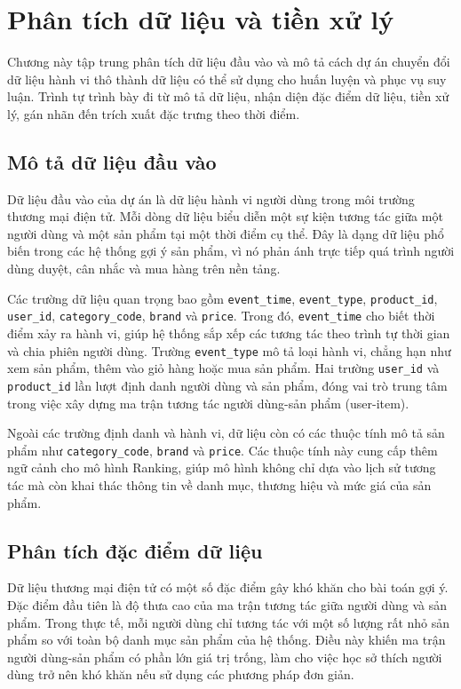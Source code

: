 ﻿\chapter{Phân tích dữ liệu và tiền xử lý}

Chương này tập trung phân tích dữ liệu đầu vào và mô tả cách dự án chuyển đổi dữ liệu hành vi thô thành dữ liệu có thể sử dụng cho huấn luyện và phục vụ suy luận. Trình tự trình bày đi từ mô tả dữ liệu, nhận diện đặc điểm dữ liệu, tiền xử lý, gán nhãn đến trích xuất đặc trưng theo thời điểm.

\section{Mô tả dữ liệu đầu vào}
Dữ liệu đầu vào của dự án là dữ liệu hành vi người dùng trong môi trường thương mại điện tử. Mỗi dòng dữ liệu biểu diễn một sự kiện tương tác giữa một người dùng và một sản phẩm tại một thời điểm cụ thể. Đây là dạng dữ liệu phổ biến trong các hệ thống gợi ý sản phẩm, vì nó phản ánh trực tiếp quá trình người dùng duyệt, cân nhắc và mua hàng trên nền tảng.
\medskip

Các trường dữ liệu quan trọng bao gồm \texttt{event\_time}, \texttt{event\_type}, \texttt{product\_id}, \texttt{user\_id}, \texttt{category\_code}, \texttt{brand} và \texttt{price}. Trong đó, \texttt{event\_time} cho biết thời điểm xảy ra hành vi, giúp hệ thống sắp xếp các tương tác theo trình tự thời gian và chia phiên người dùng. Trường \texttt{event\_type} mô tả loại hành vi, chẳng hạn như xem sản phẩm, thêm vào giỏ hàng hoặc mua sản phẩm. Hai trường \texttt{user\_id} và \texttt{product\_id} lần lượt định danh người dùng và sản phẩm, đóng vai trò trung tâm trong việc xây dựng ma trận tương tác người dùng-sản phẩm (user-item).
\medskip

Ngoài các trường định danh và hành vi, dữ liệu còn có các thuộc tính mô tả sản phẩm như \texttt{category\_code}, \texttt{brand} và \texttt{price}. Các thuộc tính này cung cấp thêm ngữ cảnh cho mô hình Ranking, giúp mô hình không chỉ dựa vào lịch sử tương tác mà còn khai thác thông tin về danh mục, thương hiệu và mức giá của sản phẩm.

\section{Phân tích đặc điểm dữ liệu}
Dữ liệu thương mại điện tử có một số đặc điểm gây khó khăn cho bài toán gợi ý. Đặc điểm đầu tiên là độ thưa cao của ma trận tương tác giữa người dùng và sản phẩm. Trong thực tế, mỗi người dùng chỉ tương tác với một số lượng rất nhỏ sản phẩm so với toàn bộ danh mục sản phẩm của hệ thống. Điều này khiến ma trận người dùng-sản phẩm có phần lớn giá trị trống, làm cho việc học sở thích người dùng trở nên khó khăn nếu sử dụng các phương pháp đơn giản.
\medskip

